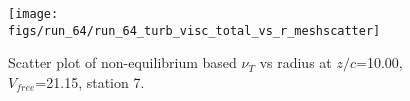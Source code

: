 \begin{figure}[H]
\centering
\texttt{[image: figs/run\_64/run\_64\_turb\_visc\_total\_vs\_r\_meshscatter]}
\caption{Scatter plot of non-equilibrium based $\nu_T$ vs radius at $z/c$=10.00, $V_{free}$=21.15, station 7.}
\label{fig:run_64_turb_visc_total_vs_r_meshscatter}
\end{figure}


